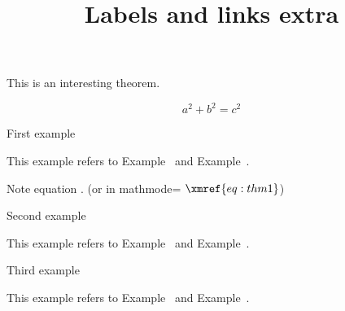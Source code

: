 \documentclass{ximera}
\title{Labels and links extra}
\begin{document}
\begin{abstract}
\end{abstract}
\maketitle
\label{xim:problemNumbersBase}


 \begin{theorem} \label{thm:1}
  
  This is an interesting  theorem.  

  \begin{equation}
    \label{eq:thm1}
    a^2 + b^2 = c^2
  \end{equation}
  
 \end{theorem}

\begin{example} \label{ex:1}
 First example  

 This example refers to Example~ and Example~.

 Note equation . (or in mathmode= $\xmref{eq:thm1}$)
\end{example}

\begin{example} \label{ex:2}
 Second example  

  This example refers to Example~ and Example~.
\end{example}

\begin{example} \label{ex:3}
 Third example  

  This example refers to Example~ and Example~.
\end{example}

\lipsum
\lipsum
\lipsum
\lipsum
\end{document}
